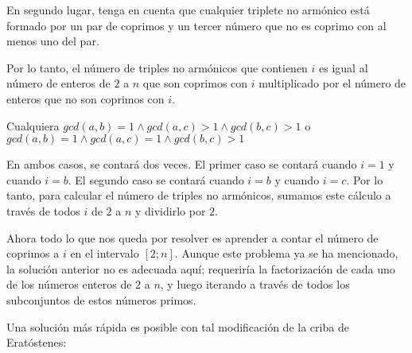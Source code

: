 En segundo lugar, tenga en cuenta que cualquier triplete no armónico está formado por un par de coprimos y un tercer número que no es coprimo con al menos uno del par.

Por lo tanto, el número de triples no armónicos que contienen $i$ es igual al número de enteros de $2$ a $n$ que son coprimos con $i$ multiplicado por el número de enteros que no son coprimos con $i$.

Cualquiera $gcd(a,b) = 1 \wedge gcd(a,c) > 1 \wedge gcd(b,c) > 1$ o $gcd(a,b) = 1 \wedge gcd(a,c) = 1 \wedge gcd(b,c) > 1$

En ambos casos, se contará dos veces. El primer caso se contará cuando $i = 1$ y cuando $i = b$. El 
segundo caso se contará cuando $i = b$ y cuando $i = c$. Por lo tanto, para calcular el número de triples no armónicos, sumamos este cálculo a través de todos $i$ de $2$ a $n$ y dividirlo por $2$.

Ahora todo lo que nos queda por resolver es aprender a contar el número de coprimos a $i$ en el intervalo $[2;n]$. Aunque este problema ya se ha mencionado, la solución anterior no es adecuada aquí; requeriría la factorización de cada uno de los números enteros de $2$ a $n$, y luego iterando a través de todos los subconjuntos de estos números primos.


Una solución más rápida es posible con tal modificación de la criba de Eratóstenes:

